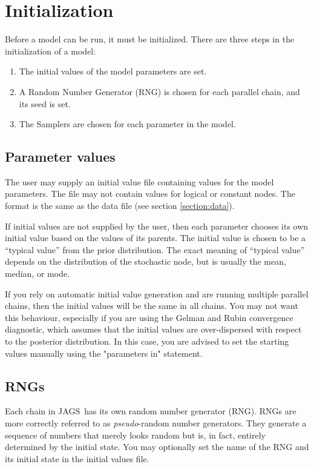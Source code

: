 \documentclass[11pt, a4paper, titlepage]{report}
\newcommand{\JAGS}{\textsf{JAGS}}
\begin{document}
\section{Initialization}

Before a model can be run, it must be initialized. There are three
steps in the initialization of a model:
\begin{enumerate}
\item The initial values of the model parameters are set.
\item A Random Number Generator (RNG) is chosen for each parallel chain,
  and its seed is set.
\item The Samplers are chosen for each parameter in the model. 
\end{enumerate}

\subsection{Parameter values}

The user may supply an initial value file containing values for the
model parameters. The file may not contain values for logical or
constant nodes. The format is the same as the data file (see section
\ref{section:data}).

If initial values are not supplied by the user, then each parameter
chooses its own initial value based on the values of its parents.  The
initial value is chosen to be a ``typical value'' from the prior
distribution. The exact meaning of ``typical value'' depends on the
distribution of the stochastic node, but is usually the mean, median,
or mode.

If you rely on automatic initial value generation and are running
multiple parallel chains, then the initial values will be the same in
all chains.  You may not want this behaviour, especially if you are
using the Gelman and Rubin convergence diagnostic, which assumes that
the initial values are over-dispersed with respect to the posterior
distribution. In this case, you are advised to set the starting values
manually using the "parameters in" statement.

\subsection{RNGs}
\label{section:rngs}

Each chain in \JAGS\ has its own random number generator (RNG). RNGs
are more correctly referred to as {\em pseudo}-random number
generators. They generate a sequence of numbers that merely looks
random but is, in fact, entirely determined by the initial state.  You
may optionally set the name of the RNG and its initial state in the
initial values file.
\end{document}
